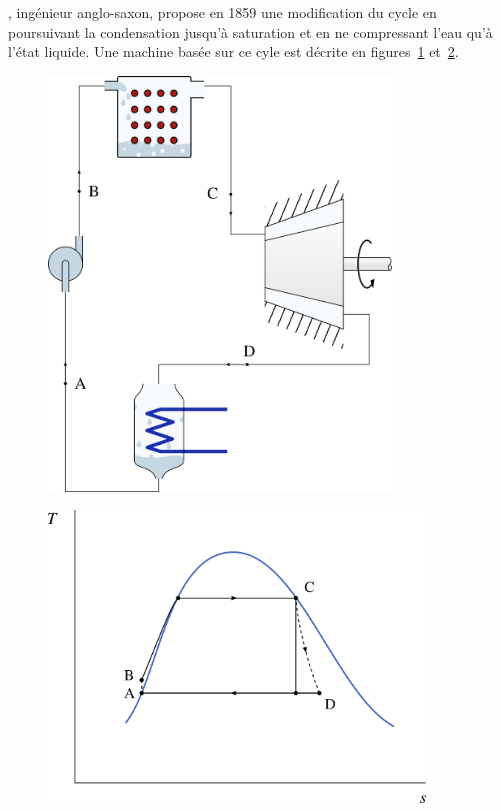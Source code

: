 		, ingénieur anglo-saxon, propose en 1859 une modification du cycle en poursuivant la condensation jusqu’à saturation et en ne compressant l’eau qu’à l’état liquide. Une machine basée sur ce cyle est décrite en figures~\ref{fig_cycle_rankine} et~\ref{fig_ts_lv_rankine}.

		\begin{figure}
			\begin{center}
				\includegraphics[height=11cm]{images/circuit_rankine.png}
			\end{center}
			\label{fig_cycle_rankine}
		\end{figure}

		\begin{figure}
			\begin{center}
				\includegraphics[width=10cm]{images/ts_lv_rankine.png}
			\end{center}
			\label{fig_ts_lv_rankine}
		\end{figure}

